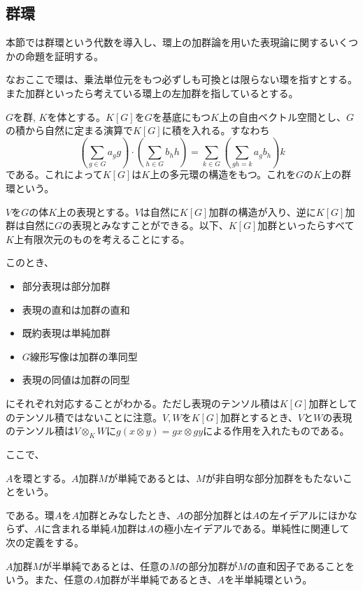 \documentclass{ltjsreport}
\begin{document}
\subsection{群環}

本節では群環という代数を導入し、環上の加群論を用いた表現論に関するいくつかの命題を証明する。

なおここで環は、乗法単位元をもつ必ずしも可換とは限らない環を指すとする。また加群といったら考えている環上の左加群を指しているとする。

\begin{defin}
  $G$を群, $K$を体とする。$K[G]$を$G$を基底にもつ$K$上の自由ベクトル空間とし、$G$の積から自然に定まる演算で$K[G]$に積を入れる。すなわち
  \[
  \left(\sum_{g\in G}a_gg\right)\cdot\left(\sum_{h\in G}b_hh\right)  =\sum_{k \in G}\left(\sum_{gh=k}a_gb_h\right)k
  \]
  である。これによって$K[G]$は$K$上の多元環の構造をもつ。これを$G$の$K$上の群環という。
\end{defin}

$V$を$G$の体$K$上の表現とする。$V$は自然に$K[G]$加群の構造が入り、逆に$K[G]$加群は自然に$G$の表現とみなすことができる。以下、$K[G]$加群といったらすべて$K$上有限次元のものを考えることにする。

このとき、
\begin{itemize}
  \item 部分表現は部分加群
  \item 表現の直和は加群の直和
  \item 既約表現は単純加群
  \item $G$線形写像は加群の準同型
  \item 表現の同値は加群の同型
\end{itemize}
にそれぞれ対応することがわかる。ただし表現のテンソル積は$K[G]$加群としてのテンソル積ではないことに注意。$V,W$を$K[G]$加群とするとき、$V$と$W$の表現のテンソル積は$V\otimes_{K}W$に$g(x\otimes y)=gx\otimes gy$による作用を入れたものである。

ここで、

\begin{defin}
  $A$を環とする。$A$加群$M$が単純であるとは、$M$が非自明な部分加群をもたないことをいう。
\end{defin}

である。環$A$を$A$加群とみなしたとき、$A$の部分加群とは$A$の左イデアルにほかならず、$A$に含まれる単純$A$加群は$A$の極小左イデアルである。単純性に関連して次の定義をする。

\begin{defin}
  $A$加群$M$が半単純であるとは、任意の$M$の部分加群が$M$の直和因子であることをいう。また、任意の$A$加群が半単純であるとき、$A$を半単純環という。
\end{defin}
\end{document}
